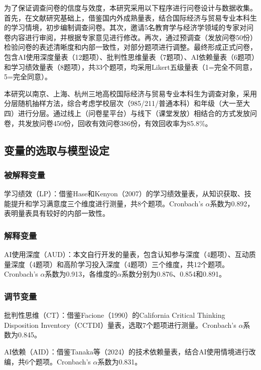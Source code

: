 \documentclass{njtech-thesis}
\begin{document}
为了保证调查问卷的信度与效度，本研究采用以下程序进行问卷设计与数据收集。首先，在文献研究基础上，借鉴国内外成熟量表，结合国际经济与贸易专业本科生的学习情境，初步编制调查问卷。其次，邀请5名教育学与经济学领域的专家对问卷内容进行审阅，并根据专家意见进行修改。再次，通过预调查（发放问卷50份）检验问卷的表述清晰度和内部一致性，对部分题项进行调整。最终形成正式问卷，包含AI使用深度量表（12题项）、批判性思维量表（7题项）、AI依赖量表（6题项）和学习绩效量表（8题项），共33个题项，均采用Likert五级量表（1=完全不同意，5=完全同意）。

本研究以南京、上海、杭州三地高校国际经济与贸易专业本科生为调查对象，采用分层随机抽样方法，综合考虑学校层次（985/211/普通本科）和年级（大一至大四）进行分层。通过线上（问卷星平台）与线下（课堂发放）相结合的方式发放问卷，共发放问卷450份，回收有效问卷386份，有效回收率为85.8\%。

\subsection{变量的选取与模型设定}

\subsubsection{被解释变量}

学习绩效（LP）：借鉴Hase和Kenyon（2007）的学习绩效量表，从知识获取、技能提升和学习满意度三个维度进行测量，共8个题项。Cronbach's $\alpha$系数为0.892，表明量表具有较好的内部一致性。

\subsubsection{解释变量}

AI使用深度（AUD）：本文自行开发的量表，包含认知参与深度（4题项）、互动质量深度（4题项）和高阶学习投入深度（4题项）三个维度，共12个题项。Cronbach's $\alpha$系数为0.913，各维度的$\alpha$系数分别为0.876、0.854和0.891。

\subsubsection{调节变量}

批判性思维（CT）：借鉴Facione（1990）的California Critical Thinking Disposition Inventory（CCTDI）量表，选取7个题项进行测量。Cronbach's $\alpha$系数为0.845。

AI依赖（AID）：借鉴Tanaka等（2024）的技术依赖量表，结合AI使用情境进行改编，共6个题项。Cronbach's $\alpha$系数为0.831。
\end{document}
